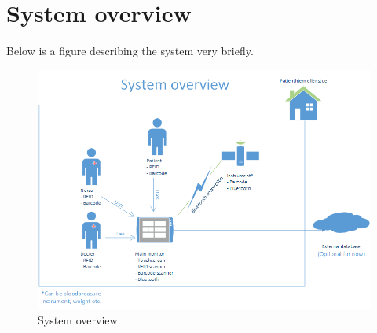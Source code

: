 \section{System overview}
Below is a figure describing the system very briefly.
\begin{figure}[H]
\centering
\includegraphics[width=1\textwidth]{billeder/systemoversigt}
\caption{System overview}
\end{figure}












